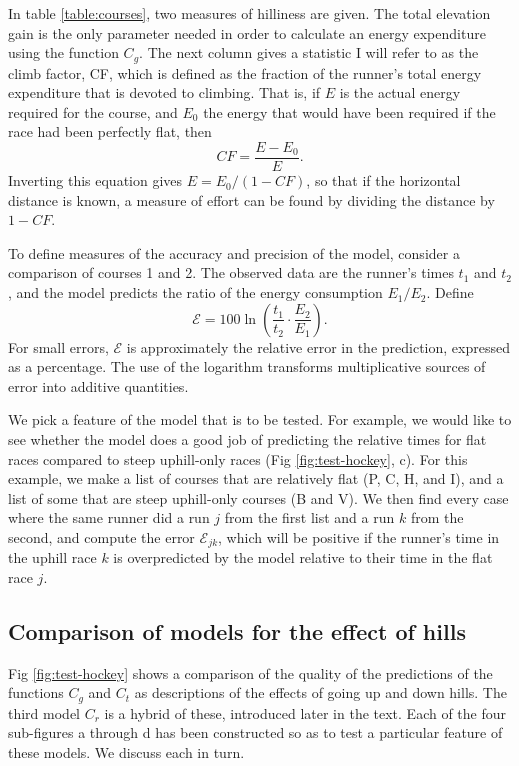 \documentclass[10pt,letterpaper]{article}
\begin{document}
In table \ref{table:courses}, two measures of hilliness are given. The total elevation gain
is the only parameter needed in order to calculate an energy expenditure using the function
$C_g$. The next column gives a statistic I will refer to as the climb factor, CF, which is
defined as the fraction of the runner's total energy expenditure that is devoted to climbing.
That is, if $E$ is the actual energy required for the course, and $E_0$ the energy that
would have been required if the race had been perfectly flat, then 
\begin{equation}
  CF=\frac{E-E_0}{E}.
\end{equation}
Inverting this equation gives $E=E_0/(1-CF)$, so that if the horizontal distance is
known, a measure of effort can be found by dividing the distance by $1-CF$.

To define measures of the accuracy and precision of the model, consider a comparison
of courses 1 and 2. The observed data are the runner's times $t_1$ and $t_2$, and
the model predicts the ratio of the energy consumption $E_1/E_2$. Define
\begin{equation}\label{eq:define-e}
  \mathcal{E} = 100 \ln\left(\frac{t_1}{t_2}\cdot\frac{E_2}{E_1}\right).
\end{equation}
For small errors, $\mathcal{E}$ is approximately the relative error in the prediction, expressed
as a percentage. The use of the logarithm transforms multiplicative sources of
error into additive quantities.

We pick a feature of the model that is to be tested. For example, we would like to see
whether the model does a good job of predicting the relative times for flat races
compared to steep uphill-only races (Fig \ref{fig:test-hockey}, c). For this example, we make a list of courses
that are relatively flat (P, C, H, and I), and a list of some that are steep uphill-only
courses (B and V). We then find every case where the same runner did a run $j$ from the first
list and a run $k$ from the second, and compute the error $\mathcal{E}_{jk}$, which will be
positive if the runner's time in the uphill race $k$ is overpredicted by the model relative
to their time in the flat race $j$.

\subsection{Comparison of models for the effect of hills}

Fig \ref{fig:test-hockey} shows a comparison of the quality of the predictions of the functions
$C_g$ and $C_t$ as descriptions of the effects of going up and down hills.
The third model $C_r$ is a hybrid of these, introduced later in the text.
Each of the four sub-figures a through d has been constructed so as to test a particular
feature of these models. We discuss each in turn.
\end{document}
